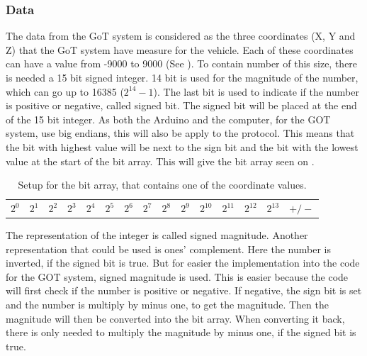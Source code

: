\subsubsection{Data}
The data from the GoT system is considered as the three coordinates (X, Y and Z) that the GoT system have measure for the vehicle. Each of these coordinates can have a value from -9000 to 9000 (See ). To contain number of this size, there is needed a 15 bit signed integer. 14 bit is used for the magnitude of the number, which can go up to 16385 ($2^{14}-1$). The last bit is used to indicate if the number is positive or negative, called signed bit. The signed bit will be placed at the end of the 15 bit integer. As both the Arduino and the computer, for the GOT system, use big endians, this will also be apply to the protocol. This means that the bit with highest value will be next to the sign bit and the bit with the lowest value at the start of the bit array. This will give the bit array seen on .

\begin{table}[H]
\centering
\begin{tabular}{|>{\centering\arraybackslash}m{0.5cm}|>{\centering\arraybackslash}m{0.5cm}|>{\centering\arraybackslash}m{0.5cm}|>{\centering\arraybackslash}m{0.5cm}|>{\centering\arraybackslash}m{0.5cm}|>{\centering\arraybackslash}m{0.5cm}|>{\centering\arraybackslash}m{0.5cm}|>{\centering\arraybackslash}m{0.5cm}|>{\centering\arraybackslash}m{0.5cm}|>{\centering\arraybackslash}m{0.5cm}|>{\centering\arraybackslash}m{0.5cm}|>{\centering\arraybackslash}m{0.5cm}|>{\centering\arraybackslash}m{0.5cm}|>{\centering\arraybackslash}m{0.5cm}|>{\centering\arraybackslash}m{0.65cm}|}
\multicolumn{15}{c}{15 bits} \\
\hline
$2^0$ & $2^1$ & $2^2$ & $2^3$ & $2^4$ & $2^5$ & $2^6$ & $2^7$ & $2^8$ & $2^9$ & $2^{10}$ & $2^{11}$ & $2^{12}$ & $2^{13}$ & $+/-$ \\
\hline
\end{tabular}
\caption{Setup for the bit array, that contains one of the coordinate values.}
\label{CoorSetup}
\end{table}

The representation of the integer is called signed magnitude. Another representation that could be used is ones' complement. Here the number is inverted, if the signed bit is true. But for easier the implementation into the code for the GOT system, signed magnitude is used. This is easier because the code will first check if the number is positive or negative. If negative, the sign bit is set and the number is multiply by minus one, to get the magnitude. Then the magnitude will then be converted into the bit array. When converting it back, there is only needed to multiply the magnitude by minus one, if the signed bit is true.

